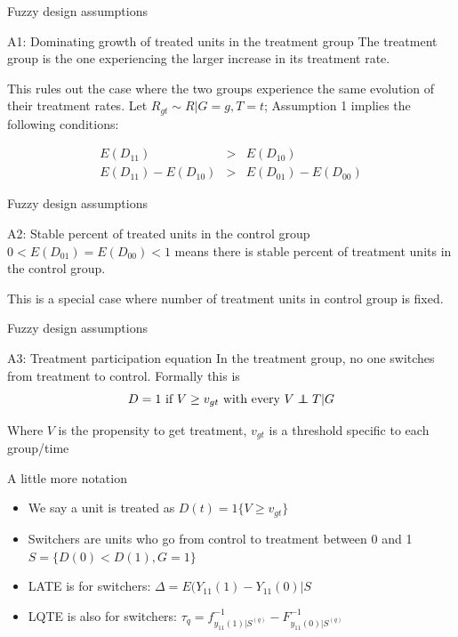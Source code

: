 \documentclass{beamer}
\newcommand\independent{\protect\mathpalette{\protect\independenT}{\perp}}
\def\independenT#1#2{\mathrel{\rlap{$#1#2$}\mkern2mu{#1#2}}}
\begin{document}
\begin{frame}{Fuzzy design assumptions}




\begin{block}{A1: Dominating growth of treated units in the treatment group}
The treatment group is the one experiencing the larger increase in its treatment rate. 
\end{block}
This rules out the case where the two groups experience the same evolution of their treatment rates. Let $R_{gt} \sim R|G=g, T=t$; Assumption 1 implies the following conditions:

\begin{eqnarray*}
E(D_{11})&>&E(D_{10}) \\
E(D_{11}) - E(D_{10}) &>& E(D_{01}) - E(D_{00})
\end{eqnarray*}

\end{frame}


\begin{frame}{Fuzzy design assumptions}

\begin{block}{A2: Stable percent of treated units in the control group}
$0<E(D_{01} ) = E(D_{00})<1$ means there is stable percent of treatment units in the control group.
\end{block}This is a special case where number of treatment units in control group is fixed. 

\end{frame}

\begin{frame}{Fuzzy design assumptions}

\begin{block}{A3: Treatment participation equation}
In the treatment group, no one switches from treatment to control. Formally this is $$D=1\text{ if } V \geq v_{gt}\text{ with every } V \independent T|G$$
\end{block}Where $V$ is the propensity to get treatment, $v_{gt}$ is a threshold specific to each group/time


\end{frame}

\begin{frame}{A little more notation}

\begin{itemize}
\item We say a unit is treated as $D(t) = 1 \{V \geq v_{gt} \}$
\item Switchers are units who go from control to treatment between 0 and 1 $S= \{ D(0) <D(1), G=1 \}$
\item LATE is for switchers: $\Delta=E(Y_{11}(1) - Y_{11}(0) | S$
\item LQTE is also for switchers: $\tau_q = f^{-1}_{y_{11}(1)|S^(q)} - F^{-1}_{y_{11}(0)|S^(q)}$

\end{itemize}

\end{frame}
\end{document}
